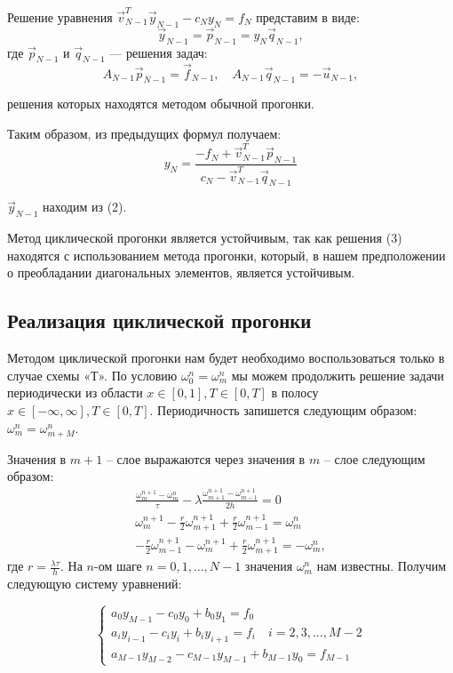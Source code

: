 \documentclass[titlepage]{article}
\begin{document}
Решение уравнения $\vec v_{N-1}^T \vec y_{N-1} - c_Ny_N = f_N$ представим в виде:
\begin{equation*}
	\vec y_{N-1} = \vec p_{N-1} = y_N \vec q_{N-1}, \tag{2}
\end{equation*}
где $\vec p_{N-1}$ и $\vec q_{N-1}$ --- решения задач:
\begin{equation*}
	A_{N-1}\vec p_{N-1} = \vec f_{N-1}, \quad A_{N-1}\vec q_{N-1} = -\vec u_{N-1}, \tag{3}
\end{equation*}

решения которых находятся методом обычной прогонки. 

Таким образом, из предыдущих формул получаем:
\begin{equation*}
	y_N = \frac{-f_N + \vec v_{N-1}^T\vec p_{N-1}}{c_N - \vec v_{N-1}^T\vec q_{N-1}}
\end{equation*}

$\vec y_{N-1}$ находим из (2).

Метод циклической прогонки является устойчивым, так как решения (3) находятся с использованием метода прогонки, который, в нашем предположении о преобладании диагональных элементов, является устойчивым.

\subsection{Реализация циклической прогонки}
Методом циклической прогонки нам будет необходимо воспользоваться только в случае схемы «Т». По условию $\omega_0^n = \omega_m^n$ мы можем продолжить решение задачи периодически из области $x \in [0,1], T \in [0,T]$ в полосу $x \in [-\infty, \infty], T \in [0,T]$. Периодичность запишется следующим образом: $\omega_m^n = \omega_{m+M}^n$.

Значения в $m+1$ -- слое выражаются через значения в $m$ -- слое следующим образом:
\begin{gather*}
	\frac{\omega_m^{n+1} - \omega_m^n}{\tau} - \lambda\frac{\omega_{m+1}^{n+1} - \omega_{m-1}^{n+1}}{2h} = 0 \\
	\omega_m^{n+1} - \frac{r}{2}\omega_{m+1}^{n+1} + \frac{r}{2}\omega_{m-1}^{n+1} = \omega_m^n \\
	-\frac{r}{2}\omega_{m-1}^{n+1} - \omega_m^{n+1} + \frac{r}{2}\omega_{m+1}^{n+1} = -\omega_m^n, 
\end{gather*}
где $r = \frac{\lambda\tau}{h}$.
На $n$-ом шаге $n=0,1,\dots,N-1$ значения $\omega_m^n$ нам известны. Получим следующую систему уравнений:

\begin{equation*}
	\begin{cases}
		a_0y_{M-1} - c_0y_0 + b_0y_1 = f_0 \\
		a_iy_{i-1} - c_iy_i + b_iy_{i+1} = f_i \quad i = 2,3,\dots,M-2 \\
		a_{M-1}y_{M-2} - c_{M-1}y_{M-1} + b_{M-1}y_0 = f_{M-1}
	\end{cases}
\end{equation*}
\end{document}
